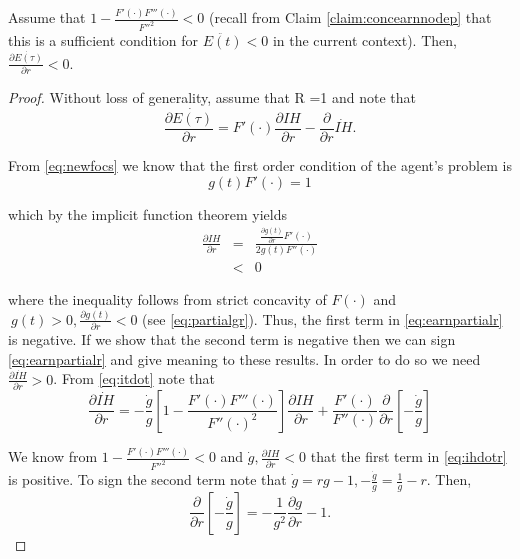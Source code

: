 \begin{claim} \label{claim:moreconcwithighr}
Assume that $1 - \frac{F'(\cdot) F'''(\cdot)}{{F''}^2} < 0$ (recall from Claim \ref{claim:concearnnodep} that this is a sufficient condition for $\ddot{E(t)}<0$ in the current context). Then, $\frac{\partial \dot{E(\tau)}}{\partial r} < 0$.
\end{claim} 

\begin{proof}
Without loss of generality, assume that R =1 and note that\\
\begin{equation}
\frac{\partial \dot{E(\tau)} }{\partial r} = F'(\cdot) \frac{\partial IH}{\partial r} - \frac{\partial}{\partial r} \dot{IH}. \label{eq:earnpartialr}
\end{equation}

\noindent From \eqref{eq:newfocs} we know that the first order condition of the agent's problem is
\begin{equation}
g(t) F'(\cdot) = 1
\end{equation}

\noindent which by the implicit function theorem yields
\begin{eqnarray}
\frac{\partial IH}{\partial r} &=& \frac{\frac{\partial g(t)}{\partial r} F'(\cdot)}{2 g(t) F''(\cdot)} \nonumber \\ 
&<& 0
\end{eqnarray}

\noindent where the inequality follows from strict concavity of $F(\cdot)$ and  $\ g(t) > 0, \frac{\partial g(t)}{ \partial r} <0$ (see \eqref{eq:partialgr}). Thus, the first term in \eqref{eq:earnpartialr} is negative. If we show that the second term is negative then we can sign \eqref{eq:earnpartialr} and give meaning to these results. In order to do so we need $\frac{\partial \dot{IH}}{\partial r} > 0$. From \eqref{eq:itdot} note that 
\begin{equation}
\frac{\partial \dot{IH}}{\partial r} = -\frac{\dot{g}}{g} \left[ 1 - \frac{F'(\cdot)F'''(\cdot)}{{F''(\cdot)}^2}\right] \frac{\partial IH}{\partial r} + \frac{F'(\cdot)}{F''(\cdot)}\frac{\partial}{\partial r} \left[ - \frac{\dot{g}}{g} \right] \label{eq:ihdotr}
\end{equation}

\indent We know from $1 - \frac{F'(\cdot) F'''(\cdot)}{{F''}^2} < 0$ and $\dot{g}, \frac{\partial IH}{\partial r} < 0$ that the first term in \eqref{eq:ihdotr} is positive. To sign the second term note that $\dot{g} = rg - 1, - \frac{\dot{g}}{g} = \frac{1}{g} - r$. Then,
\begin{equation}
\frac{\partial}{\partial r} \left[ - \frac{\dot{g}}{g} \right] = - \frac{1}{g^2} \frac{\partial g}{\partial r} - 1. \label{eq:dotgg}
\end{equation}


\end{proof}
